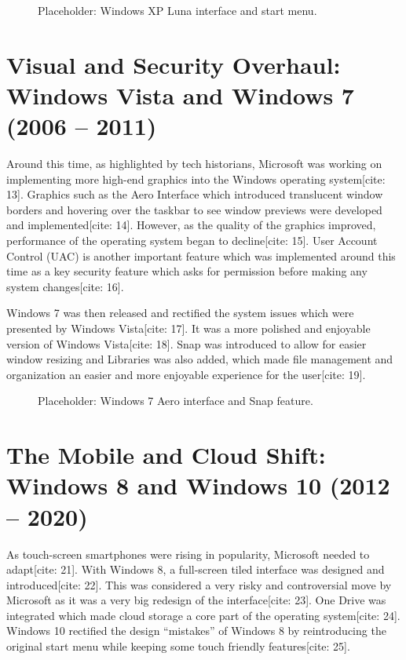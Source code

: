 \documentclass[12pt]{report}
\begin{document}
\begin{figure}[htbp]
    \centering
    \caption{Placeholder: Windows XP Luna interface and start menu.}
    \label{chap1:fig:windows_xp}
\end{figure}

\section{Visual and Security Overhaul: Windows Vista and Windows 7 (2006 – 2011)}
\label{chap1:sec:visual_security}
Around this time, as highlighted by tech historians, Microsoft was working on implementing more high-end graphics into the Windows operating system[cite: 13]. Graphics such as the Aero Interface which introduced translucent window borders and hovering over the taskbar to see window previews were developed and implemented[cite: 14]. However, as the quality of the graphics improved, performance of the operating system began to decline[cite: 15]. User Account Control (UAC) is another important feature which was implemented around this time as a key security feature which asks for permission before making any system changes[cite: 16].

Windows 7 was then released and rectified the system issues which were presented by Windows Vista[cite: 17]. It was a more polished and enjoyable version of Windows Vista[cite: 18]. Snap was introduced to allow for easier window resizing and Libraries was also added, which made file management and organization an easier and more enjoyable experience for the user[cite: 19].

\begin{figure}[htbp]
    \centering
    \caption{Placeholder: Windows 7 Aero interface and Snap feature.}
    \label{chap1:fig:windows_7}
\end{figure}

\section{The Mobile and Cloud Shift: Windows 8 and Windows 10 (2012 – 2020)}
\label{chap1:sec:mobile_cloud}
As touch-screen smartphones were rising in popularity, Microsoft needed to adapt[cite: 21]. With Windows 8, a full-screen tiled interface was designed and introduced[cite: 22]. This was considered a very risky and controversial move by Microsoft as it was a very big redesign of the interface[cite: 23]. One Drive was integrated which made cloud storage a core part of the operating system[cite: 24]. Windows 10 rectified the design “mistakes” of Windows 8 by reintroducing the original start menu while keeping some touch friendly features[cite: 25].
\end{document}
